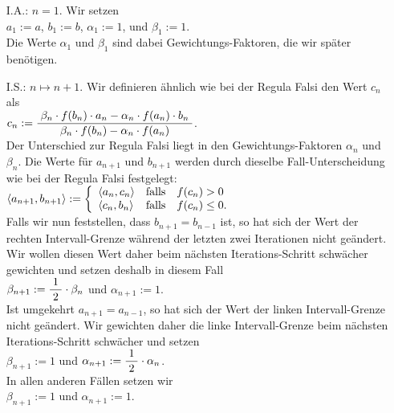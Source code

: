 \begin{enumerate}
\item[I.A.:] $n=1$.  Wir setzen 
             \\[0.2cm]
             \hspace*{1.3cm}
             $a_1 := a$, \quad $b_1 := b$, \quad $\alpha_1 := 1$, \quad und \quad $\beta_1 := 1$.
             \\[0.2cm]
             Die Werte $\alpha_1$ und $\beta_1$ sind dabei Gewichtungs-Faktoren, die wir sp\"ater ben\"otigen.
\item[I.S.:] $n \mapsto n+1$.  Wir definieren \"ahnlich wie bei der Regula Falsi den Wert $c_n$ als \\[0.2cm]
      \hspace*{1.3cm} 
      $c_n := \displaystyle\frac{\;\displaystyle\beta_n \cdot f(b_n) \cdot a_n - \alpha_n \cdot f(a_n) \cdot b_n\;}{\;\displaystyle
                     \beta_n \cdot f(b_n) - \alpha_n \cdot f(a_n)\;}
      $. 
      \\[0.3cm]
      Der Unterschied zur Regula Falsi liegt in den Gewichtungs-Faktoren $\alpha_n$ und $\beta_n$.
      Die Werte f\"ur $a_{n+1}$ und $b_{n+1}$ werden durch dieselbe Fall-Unterscheidung wie bei der Regula
      Falsi festgelegt:
      \\[0.2cm]
      \hspace*{1.3cm}
      $\pair(a_{n+1},b_{n+1}) := 
         \left\{ \begin{array}{ll}
                 \pair(a_n,c_n) & \mbox{falls}\quad f(c_n) >    0 \\
                 \pair(c_n,b_n) & \mbox{falls}\quad f(c_n) \leq 0. \\
                 \end{array}
         \right.
      $
      \\[0.2cm]
      Falls wir nun feststellen, dass $b_{n+1} = b_{n-1}$ ist, so hat sich der Wert der rechten
      Intervall-Grenze w\"ahrend der letzten zwei Iterationen nicht ge\"andert.  Wir wollen diesen Wert
      daher beim n\"achsten Iterations-Schritt 
      schw\"acher gewichten und setzen deshalb in diesem Fall
      \\[0.2cm]
      \hspace*{1.3cm}
      $\beta_{n+1} := \displaystyle\frac{\;\displaystyle1\;}{\;\displaystyle2\;} \cdot \beta_n$ \quad und \quad $\alpha_{n+1} := 1$.
      \\[0.2cm]
      Ist umgekehrt $a_{n+1} = a_{n-1}$, so hat sich der Wert der linken
      Intervall-Grenze nicht ge\"andert.  Wir gewichten daher die linke Intervall-Grenze beim n\"achsten
      Iterations-Schritt schw\"acher und setzen 
      \\[0.2cm]
      \hspace*{1.3cm}
      $\beta_{n+1} := 1$ \quad und \quad $\alpha_{n+1} := \displaystyle\frac{\;\displaystyle1\;}{\;\displaystyle2\;} \cdot \alpha_n$.
      \\[0.2cm]
      In allen anderen F\"allen setzen wir 
      \\[0.2cm]
      \hspace*{1.3cm}
      $\beta_{n+1} := 1$ \quad und \quad $\alpha_{n+1} := 1$.
\end{enumerate}
